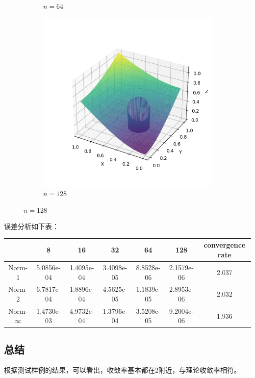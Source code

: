 \documentclass[lang=cn,a4paper,newtx,bibend=bibtex]{elegantpaper}
\begin{document}
\begin{figure}[H]
\begin{subfigure}[b]{0.18\textwidth}
      \caption{$n = 64$}
  \end{subfigure}
  \hfill
  \begin{subfigure}[b]{0.18\textwidth}
      \includegraphics[width=\textwidth]{../../res_bac/res-[data|3-mixed-irregular-e128].png}
      \caption{$n = 128$}
  \end{subfigure}
\end{figure}

误差分析如下表：

\begin{table}[H]
  \centering
  \begin{tabular}{|c|c|c|c|c|c|c|}
  \hline
   & 8 & 16 & 32 & 64 & 128 & convergence rate \\
  \hline
  Norm-1 & 5.0856e-04 & 1.4095e-04 & 3.4098e-05 & 8.8528e-06 & 2.1579e-06 & 2.037 \\
  Norm-2 & 6.7817e-04 & 1.8896e-04 & 4.5625e-05 & 1.1839e-05 & 2.8953e-06 & 2.032 \\
  Norm-$\infty$ & 1.4730e-03 & 4.9732e-04 & 1.3796e-04 & 3.5208e-05 & 9.2004e-06 & 1.936 \\
  \hline
  \end{tabular}
  \end{table}


\subsection{总结}

根据测试样例的结果，可以看出，收敛率基本都在2附近，与理论收敛率相符。

\nocite{*}
\printbibliography[heading=bibintoc, title=\ebibname]
\end{document}
